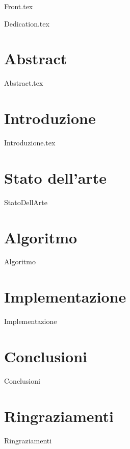 \documentclass[12pt,onesidet]{report}
\begin{document}
	
	\begin{titlepage}
     {Front.tex}
    \end{titlepage}

  
    {Dedication.tex}
    
    
    \chapter*{Abstract}
     {Abstract.tex}
    
    \newpage  
    
    \tableofcontents{}
    \listoftables
    \listoflistings
    
    
    \chapter{Introduzione}
     {Introduzione.tex}
    
    \chapter{Stato dell'arte}
    {StatoDellArte}
    
    \chapter{Algoritmo}
     {Algoritmo}
     
    \chapter{Implementazione}
     {Implementazione}
    
    \chapter{Conclusioni}
    {Conclusioni}
    
    \chapter{Ringraziamenti}
    {Ringraziamenti}
    
     
    
   
\end{document}
